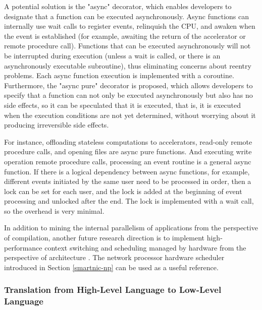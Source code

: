 A potential solution is the "async" decorator, which enables developers to designate that a function can be executed asynchronously. Async functions can internally use wait calls to register events, relinquish the CPU, and awaken when the event is established (for example, awaiting the return of the accelerator or remote procedure call). Functions that can be executed asynchronously will not be interrupted during execution (unless a wait is called, or there is an asynchronously executable subroutine), thus eliminating concerns about reentry problems. Each async function execution is implemented with a coroutine. Furthermore, the "async pure" decorator is proposed, which allows developers to specify that a function can not only be executed asynchronously but also has no side effects, so it can be speculated that it is executed, that is, it is executed when the execution conditions are not yet determined, without worrying about it producing irreversible side effects.

For instance, offloading stateless computations to accelerators, read-only remote procedure calls, and opening files are async pure functions. And executing write operation remote procedure calls, processing an event routine is a general async function. If there is a logical dependency between async functions, for example, different events initiated by the same user need to be processed in order, then a lock can be set for each user, and the lock is added at the beginning of event processing and unlocked after the end. The lock is implemented with a wait call, so the overhead is very minimal.

In addition to mining the internal parallelism of applications from the perspective of compilation, another future research direction is to implement high-performance context switching and scheduling managed by hardware from the perspective of architecture \cite{barroso2017attack}. The network processor hardware scheduler introduced in Section \ref{smartnic-np} can be used as a useful reference.

\subsubsection{Translation from High-Level Language to Low-Level Language}
\label{future:high-to-low}

